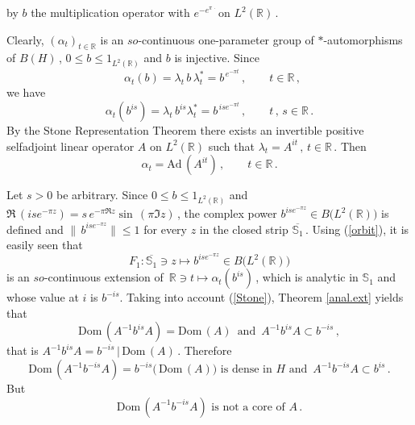 \documentclass[reqno]{amsart}
\theoremstyle{definition}
\theoremstyle{remark}
\numberwithin{equation}{section}
\theoremstyle{plain}
\begin{document}
\noindent\hspace{1.05 cm} by $b$ the multiplication operator with
$e^{-e^{\pi\,\cdot\,}}$on $L^2(\mathbb R )\,$.
\smallskip

\noindent Clearly, $(\alpha_t )_{t\in\mathbb R}$ is an
$so$-continuous one-parameter group of $*$-automorphisms of
$B(H)\,$, $0\leq b\leq 1_{L^2(\mathbb R )}$ and $b$ is injective.
Since
\begin{equation*} \phantom{x}
\alpha_t^{} (b) =\lambda_t^{}\, b\, \lambda_t^* =b^{\, e^{-\pi t}}
\, ,\qquad t\in\mathbb R\, ,
\end{equation*}
we have
\begin{equation}\label{orbit}
\alpha_t^{} (b^{is}) =\lambda_t^{}\, b^{is} \lambda_t^* =
b^{\, i s e^{-\pi t}}\, ,\qquad t\, ,\, s\in\mathbb R\, .
\end{equation}
By the Stone Representation Theorem there exists an invertible
positive selfadjoint linear operator $A$ on $L^2(\mathbb R )$
such that $\lambda_t =A^{it}\, ,\, t\in \mathbb R\,$. Then
\begin{equation}\label{Stone}
\alpha_t =\text{Ad}\, (A^{it})\, ,\qquad t\in\mathbb R\, .
\end{equation}

Let $s>0$ be arbitrary. Since $0\leq b\leq 1_{L^2(\mathbb R )}$ and
$\Re\, (ise^{-\pi z}) =s\, e^{-\pi \Re z} \sin\, (\pi \Im z )\,$,
the complex power $b^{i s e^{-\pi z}}\in B\big( L^2(\mathbb R )
\big)$ is defined and $\|\, b^{i s e^{-\pi z}}\|\leq 1$ for
every $z$ in the closed strip $\overline{\mathbb S_1}\,$.
Using (\ref{orbit}), it is easily seen that
\begin{equation*}
F_1 : \overline{\mathbb S_1}\ni z\longmapsto b^{i s e^{-\pi z}}
\in B\big( L^2(\mathbb R )\big)
\end{equation*}
is an $so$-continuous extension of $\,\mathbb R\ni t\longmapsto
\alpha_t (b^{is})\,$, which is analytic in $\mathbb S_1$ and
whose value at $i$ is $b^{-is}$. Taking into account (\ref{Stone}),
Theorem \ref{anal.ext} yields that
\begin{equation*}
\text{Dom}\, (A^{-1} b^{is} A) =\text{Dom}\, (A)\,\text{ and }\,
A^{-1} b^{is} A\subset b^{-is}\, ,
\end{equation*}
that is $A^{-1} b^{is} A =b^{-is}\, |\,\text{Dom}\, (A)\,$.
Therefore
\begin{equation}\label{yes}
\text{Dom}\, (A^{-1} b^{-is} A) =b^{-is}\big(\,\text{Dom}\, (A)
\big)\text{ is dense in } H\text{ and }\, A^{-1} b^{-is} A\subset
b^{is}\, .
\end{equation}
But
\begin{equation}\label{not}
\text{Dom}\, (A^{-1} b^{-is} A)\text{ is not a core of }A\, .
\end{equation}
\end{document}
